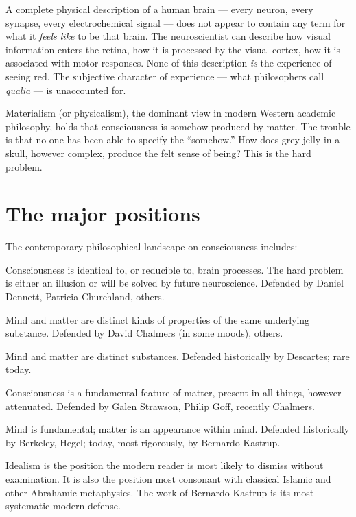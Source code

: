 \documentclass[11pt,a4paper]{book}
\theoremstyle{cleanrm}
\begin{document}
A complete physical description of a human brain --- every neuron,
every synapse, every electrochemical signal --- does not appear to
contain any term for what it \emph{feels like} to be that brain. The
neuroscientist can describe how visual information enters the retina,
how it is processed by the visual cortex, how it is associated with
motor responses. None of this description \emph{is} the experience of
seeing red. The subjective character of experience --- what
philosophers call \emph{qualia} --- is unaccounted for.

Materialism (or physicalism), the dominant view in modern Western
academic philosophy, holds that consciousness is somehow produced by
matter. The trouble is that no one has been able to specify the
``somehow.'' How does grey jelly in a skull, however complex, produce
the felt sense of being? This is the hard problem.

\section{The major positions}

The contemporary philosophical landscape on consciousness includes:

\begin{description}[leftmargin=2em]
    \item[Materialism / Physicalism.] Consciousness is identical to,
    or reducible to, brain processes. The hard problem is either an
    illusion or will be solved by future neuroscience. Defended by
    Daniel Dennett, Patricia Churchland, others.
    \item[Property Dualism.] Mind and matter are distinct kinds of
    properties of the same underlying substance. Defended by David
    Chalmers (in some moods), others.
    \item[Substance Dualism.] Mind and matter are distinct
    substances. Defended historically by Descartes; rare today.
    \item[Panpsychism.] Consciousness is a fundamental feature of
    matter, present in all things, however attenuated. Defended by
    Galen Strawson, Philip Goff, recently Chalmers.
    \item[Idealism.] Mind is fundamental; matter is an appearance
    within mind. Defended historically by Berkeley, Hegel; today,
    most rigorously, by Bernardo Kastrup.
\end{description}

Idealism is the position the modern reader is most likely to dismiss
without examination. It is also the position most consonant with
classical Islamic and other Abrahamic metaphysics. The work of
Bernardo Kastrup is its most systematic modern defense.
\end{document}
